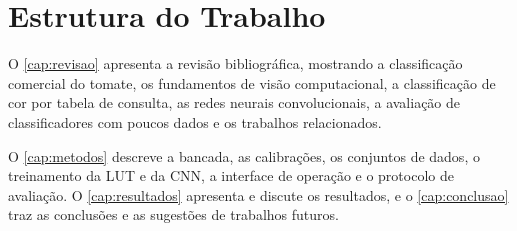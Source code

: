 \section{Estrutura do Trabalho}

O \autoref{cap:revisao} apresenta a revisão bibliográfica, mostrando a classificação comercial do tomate, os fundamentos de visão computacional, a classificação de cor por tabela de consulta, as redes neurais convolucionais, a avaliação de classificadores com poucos dados e os trabalhos relacionados. 

O \autoref{cap:metodos} descreve a bancada, as calibrações, os conjuntos de dados, o treinamento da LUT e da CNN, a interface de operação e o protocolo de avaliação. O \autoref{cap:resultados} apresenta e discute os resultados, e o \autoref{cap:conclusao} traz as conclusões e as sugestões de trabalhos futuros.


